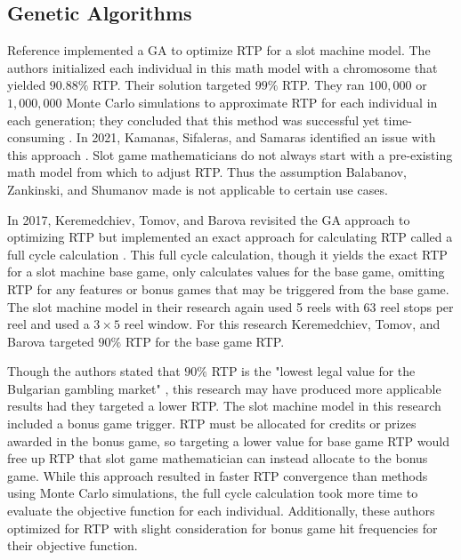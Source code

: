 \documentclass[conference]{IEEEtran}
\begin{document}
\subsection{Genetic Algorithms}
Reference \cite{balabanov2015slot} implemented a GA to optimize RTP for a slot machine model.
The authors initialized each individual in this math model with a chromosome that yielded $90.88\%$ RTP.
Their solution targeted $99\%$ RTP.
They ran $100,000$ or $1,000,000$ Monte Carlo simulations to approximate RTP for each individual in each generation; they concluded that this method was successful yet time-consuming \cite{balabanov2015slot}.
In 2021, Kamanas, Sifaleras, and Samaras identified an issue with this approach \cite{kamanas2021slot}.
Slot game mathematicians do not always start with a pre-existing math model from which to adjust RTP.
Thus the assumption Balabanov, Zankinski, and Shumanov made is not applicable to certain use cases.
\par
In 2017, Keremedchiev, Tomov, and Barova revisited the GA approach to optimizing RTP but implemented an exact approach for calculating RTP called a full cycle calculation \cite{keremedchiev2017slot}.
This full cycle calculation, though it yields the exact RTP for a slot machine base game, only calculates values for the base game, omitting RTP for any features or bonus games that may be triggered from the base game.
The slot machine model in their research again used 5 reels with 63 reel stops per reel and used a $3\times 5$ reel window.
For this research Keremedchiev, Tomov, and Barova targeted $90\%$ RTP for the base game RTP.
\par
Though the authors stated that $90\%$ RTP is the "lowest legal value for the Bulgarian gambling market" \cite{keremedchiev2017slot}, this research may have produced more applicable results had they targeted a lower RTP.
The slot machine model in this research included a bonus game trigger.
RTP must be allocated for credits or prizes awarded in the bonus game, so targeting a lower value for base game RTP would free up RTP that slot game mathematician can instead allocate to the bonus game. 
While this approach resulted in faster RTP convergence than methods using Monte Carlo simulations, the full cycle calculation took more time to evaluate the objective function for each individual.
Additionally, these authors optimized for RTP with slight consideration for bonus game hit frequencies for their objective function.
\end{document}
